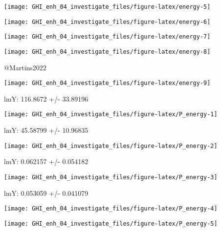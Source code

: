 \documentclass[
  10pt,
  a4paper,oneside]{article}
\begin{document}
\begin{center}\texttt{[image: GHI\_enh\_04\_investigate\_files/figure-latex/energy-5]} \end{center}

\begin{center}\texttt{[image: GHI\_enh\_04\_investigate\_files/figure-latex/energy-6]} \end{center}

\begin{center}\texttt{[image: GHI\_enh\_04\_investigate\_files/figure-latex/energy-7]} \end{center}

\begin{center}\texttt{[image: GHI\_enh\_04\_investigate\_files/figure-latex/energy-8]} \end{center}

@Martins2022

\begin{center}\texttt{[image: GHI\_enh\_04\_investigate\_files/figure-latex/energy-9]} \end{center}

lmY: 116.8672 +/- 33.89196

\begin{center}\texttt{[image: GHI\_enh\_04\_investigate\_files/figure-latex/P\_energy-1]} \end{center}

lmY: 45.58799 +/- 10.96835

\begin{center}\texttt{[image: GHI\_enh\_04\_investigate\_files/figure-latex/P\_energy-2]} \end{center}

lmY: 0.062157 +/- 0.054182

\begin{center}\texttt{[image: GHI\_enh\_04\_investigate\_files/figure-latex/P\_energy-3]} \end{center}

lmY: 0.053059 +/- 0.041079

\begin{center}\texttt{[image: GHI\_enh\_04\_investigate\_files/figure-latex/P\_energy-4]} \end{center}

\begin{center}\texttt{[image: GHI\_enh\_04\_investigate\_files/figure-latex/P\_energy-5]} \end{center}
\end{document}
